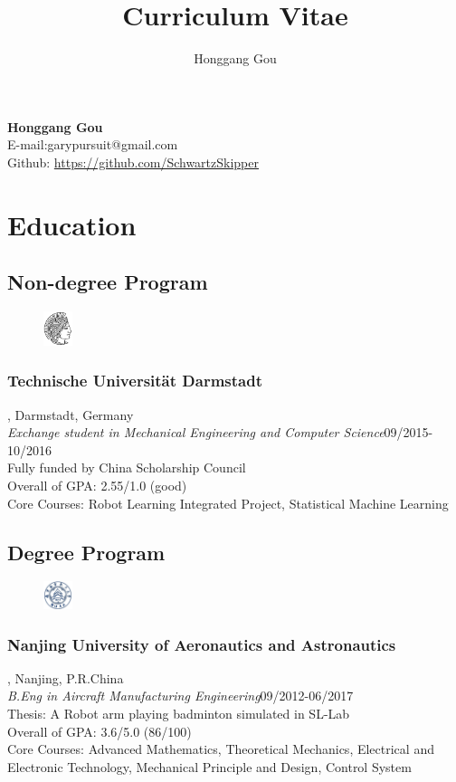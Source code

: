 \documentclass{article}
\makeatletter
\renewcommand{\maketitle}{
\begin{center}
{\Large\bfseries
Honggang Gou\\}
\vspace{0em}
E-mail:garypursuit@gmail.com\\
Github: \url{https://github.com/SchwartzSkipper}
\end{center}
}
\makeatother
\begin{document}
   
\title{Curriculum Vitae}
\author{Honggang Gou}

\maketitle

\section{Education}
\subsection{Non-degree Program}
\begin{figure}
    \begin{center}
        \includegraphics[width=0.075\textwidth]{./pic/tud.png}
    \end{center}
\end{figure}
\subsubsection{Technische Universit\"at Darmstadt}, Darmstadt, Germany\\
\emph{Exchange student in Mechanical Engineering and Computer Science}{\hfill09/2015-10/2016\\}
Fully funded by China Scholarship Council\\
Overall of GPA: 2.55/1.0 (good)\\
Core Courses: Robot Learning Integrated Project, Statistical Machine Learning\\
\subsection{Degree Program}
\begin{figure}
    \begin{center}
        \includegraphics[width=0.075\textwidth]{./pic/NUAA.jpg}
    \end{center}
\end{figure}
\subsubsection{Nanjing University of Aeronautics and Astronautics}
, Nanjing, P.R.China\\
\emph{B.Eng in Aircraft Manufacturing Engineering}{\hfill09/2012-06/2017\\}
Thesis: A Robot arm playing badminton simulated in SL-Lab\\
Overall of GPA: 3.6/5.0 (86/100)\\
Core Courses: Advanced Mathematics, Theoretical Mechanics, Electrical and Electronic Technology, Mechanical Principle and Design, Control System
\end{document}
